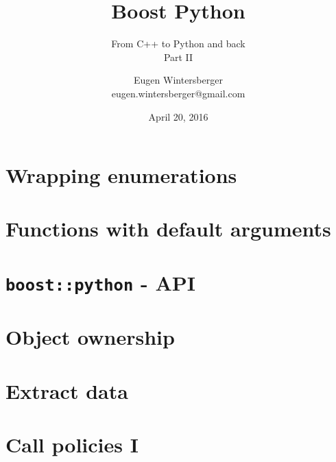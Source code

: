 \documentclass{beamer}
\title{{\Huge Boost Python}}
\subtitle{From C++ to Python and back \\ Part II}
\author{Eugen Wintersberger\\ \small{eugen.wintersberger@gmail.com}}
\date{April 20, 2016}
\begin{document}
\frame{\titlepage}

\part{Wrapping enumerations}
\frame{\partpage}



\part{Functions with default arguments}
\frame{\partpage}


\part{\texttt{boost::python} - API}
\frame{\partpage}


\part{Object ownership}
\frame{\partpage}


\part{Extract data}
\frame{\partpage}


\part{Call policies I}
\frame{\partpage}

\end{document}
